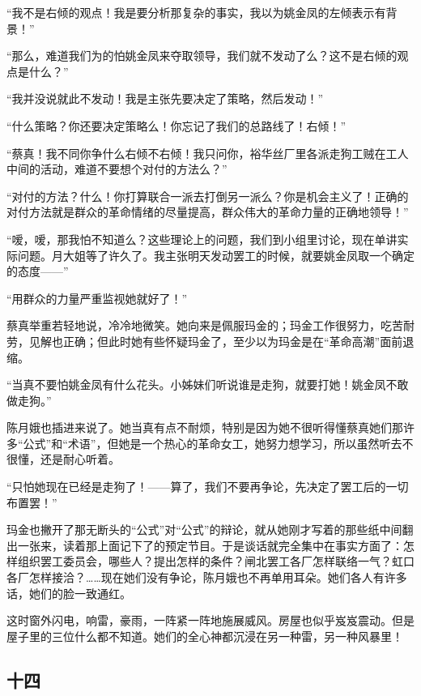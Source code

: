 \par “我不是右倾的观点！我是要分析那复杂的事实，我以为姚金凤的左倾表示有背景！”
\par “那么，难道我们为的怕姚金凤来夺取领导，我们就不发动了么？这不是右倾的观点是什么？”
\par “我并没说就此不发动！我是主张先要决定了策略，然后发动！”
\par “什么策略？你还要决定策略么！你忘记了我们的总路线了！右倾！”
\par “蔡真！我不同你争什么右倾不右倾！我只问你，裕华丝厂里各派走狗工贼在工人中间的活动，难道不要想个对付的方法么？”
\par “对付的方法？什么！你打算联合一派去打倒另一派么？你是机会主义了！正确的对付方法就是群众的革命情绪的尽量提高，群众伟大的革命力量的正确地领导！”
\par “嗳，嗳，那我怕不知道么？这些理论上的问题，我们到小组里讨论，现在单讲实际问题。月大姐等了许久了。我主张明天发动罢工的时候，就要姚金凤取一个确定的态度——”
\par “用群众的力量严重监视她就好了！”
\par 蔡真举重若轻地说，冷冷地微笑。她向来是佩服玛金的；玛金工作很努力，吃苦耐劳，见解也正确；但此时她有些怀疑玛金了，至少以为玛金是在“革命高潮”面前退缩。
\par “当真不要怕姚金凤有什么花头。小姊妹们听说谁是走狗，就要打她！姚金凤不敢做走狗。”
\par 陈月娥也插进来说了。她当真有点不耐烦，特别是因为她不很听得懂蔡真她们那许多“公式”和“术语”，但她是一个热心的革命女工，她努力想学习，所以虽然听去不很懂，还是耐心听着。
\par “只怕她现在已经是走狗了！——算了，我们不要再争论，先决定了罢工后的一切布置罢！”
\par 玛金也撇开了那无断头的“公式”对“公式”的辩论，就从她刚才写着的那些纸中间翻出一张来，读着那上面记下了的预定节目。于是谈话就完全集中在事实方面了：怎样组织罢工委员会，哪些人？提出怎样的条件？闸北罢工各厂怎样联络一气？虹口各厂怎样接洽？……现在她们没有争论，陈月娥也不再单用耳朵。她们各人有许多话，她们的脸一致通红。
\par 这时窗外闪电，响雷，豪雨，一阵紧一阵地施展威风。房屋也似乎岌岌震动。但是屋子里的三位什么都不知道。她们的全心神都沉浸在另一种雷，另一种风暴里！



\subsection*{十四}

